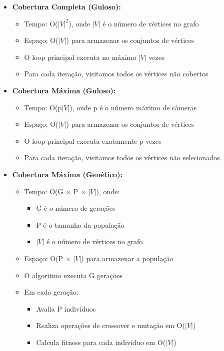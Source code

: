 \documentclass[12pt, a4paper]{report}
\begin{document}
\begin{itemize}
    \item \textbf{Cobertura Completa (Guloso):}
    \begin{itemize}
        \item Tempo: O($\lvert V \rvert^2$), onde $\lvert V \rvert$ é o número de vértices no grafo
        \item Espaço: O($\lvert V \rvert$) para armazenar os conjuntos de vértices
        \item O loop principal executa no máximo $\lvert V \rvert$ vezes
        \item Para cada iteração, visitamos todos os vértices não cobertos
    \end{itemize}
    
    \item \textbf{Cobertura Máxima (Guloso):}
    \begin{itemize}
        \item Tempo: O(p$\lvert V \rvert$), onde p é o número máximo de câmeras
        \item Espaço: O($\lvert V \rvert$) para armazenar os conjuntos de vértices
        \item O loop principal executa exatamente p vezes
        \item Para cada iteração, visitamos todos os vértices não selecionados
    \end{itemize}

    \item \textbf{Cobertura Máxima (Genético):}
    \begin{itemize}
        \item Tempo: O(G × P × $\lvert V \rvert$), onde:
        \begin{itemize}
            \item G é o número de gerações
            \item P é o tamanho da população
            \item $\lvert V \rvert$ é o número de vértices no grafo
        \end{itemize}
        \item Espaço: O(P × $\lvert V \rvert$) para armazenar a população
        \item O algoritmo executa G gerações
        \item Em cada geração:
        \begin{itemize}
            \item Avalia P indivíduos
            \item Realiza operações de crossover e mutação em O($\lvert V \rvert$)
            \item Calcula fitness para cada indivíduo em O($\lvert V \rvert$)
        \end{itemize}
    \end{itemize}
\end{itemize}
\end{document}
